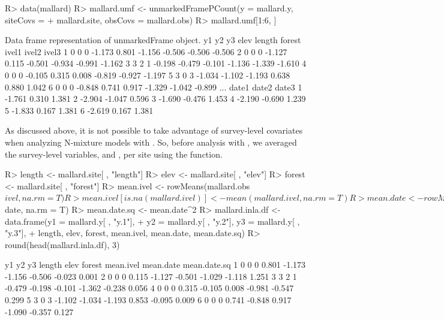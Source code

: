 \documentclass[codesnippet]{jss}
\begin{document}
\begin{CodeInput}
R> data(mallard)
R> mallard.umf <- unmarkedFramePCount(y = mallard.y, siteCovs = 
+    mallard.site, obsCovs = mallard.obs)
R> mallard.umf[1:6, ]
\end{CodeInput}
\begin{CodeOutput}
Data frame representation of unmarkedFrame object.
   y1   y2   y3    elev length forest  ivel1  ivel2  ivel3  
1   0    0    0  -1.173  0.801 -1.156 -0.506 -0.506 -0.506 
2   0    0    0  -1.127  0.115 -0.501 -0.934 -0.991 -1.162 
3   3    2    1  -0.198 -0.479 -0.101 -1.136 -1.339 -1.610 
4   0    0    0  -0.105  0.315  0.008 -0.819 -0.927 -1.197 
5   3    0    3  -1.034 -1.102 -1.193  0.638  0.880  1.042 
6   0    0    0  -0.848  0.741  0.917 -1.329 -1.042 -0.899 
...
    date1  date2  date3
1  -1.761  0.310  1.381
2  -2.904 -1.047  0.596
3  -1.690 -0.476  1.453
4  -2.190 -0.690  1.239
5  -1.833  0.167  1.381
6  -2.619  0.167  1.381
\end{CodeOutput}

As discussed above, it is not possible to take advantage of survey-level covariates when analyzing N-mixture models with .  So, before analysis with , we averaged the survey-level variables,  and , per site using the  function.

\begin{CodeInput}
R> length <- mallard.site[ , "length"]
R> elev <- mallard.site[ , "elev"]
R> forest <- mallard.site[ , "forest"]
R> mean.ivel <- rowMeans(mallard.obs$ivel, na.rm = T) 
R> mean.ivel[is.na(mallard.ivel)] <- mean(mallard.ivel, na.rm = T)
R> mean.date <- rowMeans(mallard.obs$date, na.rm = T) 
R> mean.date.sq <- mean.date^2
R> mallard.inla.df <- data.frame(y1 = mallard.y[ , "y.1"], 
+    y2 = mallard.y[ , "y.2"], y3 = mallard.y[ , "y.3"], 
+    length, elev, forest, mean.ivel, mean.date, mean.date.sq)
R> round(head(mallard.inla.df), 3)
\end{CodeInput}
\begin{CodeOutput}
  y1 y2 y3 length   elev forest mean.ivel mean.date mean.date.sq
1  0  0  0  0.801 -1.173 -1.156    -0.506    -0.023        0.001
2  0  0  0  0.115 -1.127 -0.501    -1.029    -1.118        1.251
3  3  2  1 -0.479 -0.198 -0.101    -1.362    -0.238        0.056
4  0  0  0  0.315 -0.105  0.008    -0.981    -0.547        0.299
5  3  0  3 -1.102 -1.034 -1.193     0.853    -0.095        0.009
6  0  0  0  0.741 -0.848  0.917    -1.090    -0.357        0.127
\end{CodeOutput}
\end{document}
